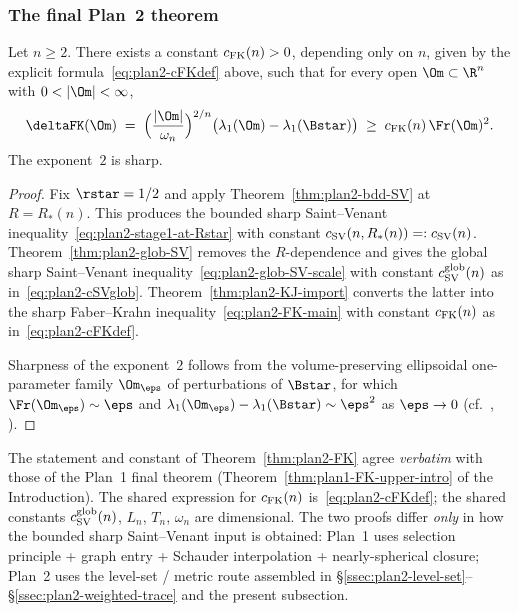 \subsubsection{The final Plan~2 theorem}
\label{sssec:plan2-final}

\begin{theorem}
\label{thm:plan2-FK}
Let $n\ge 2$. There exists a constant $c_{\rm FK}(n)>0$, depending
only on $n$, given by the explicit formula~\eqref{eq:plan2-cFKdef}
above, such that for every open $\Om\subset\R^n$ with
$0<|\Om|<\infty$,
\begin{equation}\label{eq:plan2-FK-main}
   \deltaFK(\Om)
   \;=\;
   \Bigl(\frac{|\Om|}{\omega_n}\Bigr)^{2/n}
   \bigl(\lambda_1(\Om)-\lambda_1(\Bstar)\bigr)
   \;\ge\;c_{\rm FK}(n)\,\Fr(\Om)^{2}.
\end{equation}
The exponent~$2$ is sharp.
\end{theorem}

\begin{proof}
Fix $\rstar=1/2$ and apply Theorem~\ref{thm:plan2-bdd-SV} at
$R=R_*(n)$. This produces the bounded sharp Saint--Venant
inequality~\eqref{eq:plan2-stage1-at-Rstar} with constant
$c_{\rm SV}(n,R_*(n))=:c_{\rm SV}(n)$. Theorem~\ref{thm:plan2-glob-SV}
removes the $R$-dependence and gives the global sharp Saint--Venant
inequality~\eqref{eq:plan2-glob-SV-scale} with constant
$c_{\rm SV}^{\rm glob}(n)$ as in~\eqref{eq:plan2-cSVglob}.
Theorem~\ref{thm:plan2-KJ-import} converts the latter into the sharp
Faber--Krahn inequality~\eqref{eq:plan2-FK-main} with constant
$c_{\rm FK}(n)$ as in~\eqref{eq:plan2-cFKdef}.

Sharpness of the exponent~$2$ follows from the volume-preserving
ellipsoidal one-parameter family $\Om_\eps$ of perturbations of
$\Bstar$, for which
$\Fr(\Om_\eps)\sim\eps$ and
$\lambda_1(\Om_\eps)-\lambda_1(\Bstar)\sim\eps^{2}$ as $\eps\to 0$
(cf.\ \cite[Introduction]{BraDeP2017},
\cite{AKN2023}).
\end{proof}

\begin{remark}
\label{rem:plan2-vs-plan1-normalisation}
The statement and constant of Theorem~\ref{thm:plan2-FK} agree
\emph{verbatim} with those of the Plan~1 final theorem
(Theorem~\ref{thm:plan1-FK-upper-intro} of the Introduction). The shared expression for
$c_{\rm FK}(n)$ is~\eqref{eq:plan2-cFKdef}; the shared constants
$c_{\rm SV}^{\rm glob}(n)$, $L_n$, $T_n$, $\omega_n$ are dimensional.
The two proofs differ \emph{only} in how the bounded sharp
Saint--Venant input is obtained: Plan~1 uses selection
principle + graph entry + Schauder interpolation + nearly-spherical
closure; Plan~2 uses the level-set / metric route assembled in
\S\ref{ssec:plan2-level-set}--\S\ref{ssec:plan2-weighted-trace} and
the present subsection.
\end{remark}

